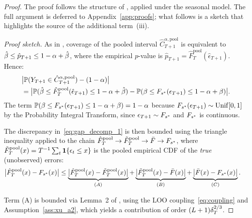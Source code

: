 \begin{proof}
The proof follows the structure of \citet[Theorem~1]{xu2023conformal},
applied under the seasonal model.  The full argument is deferred to
Appendix~\ref{app:proofs}; what follows is a sketch that highlights
the source of the additional term~(iii).

\medskip\noindent\textit{Proof sketch.}
As in \citet{xu2023conformal}, coverage of the pooled interval
$\hat{C}_{T+1}^{\alpha,\text{pool}}$ is equivalent to
$\hat{\beta} \leq \hat{p}_{T+1} \leq 1-\alpha+\hat{\beta}$,
where the empirical $p$-value is
$\hat{p}_{T+1} = \hat{F}_T^{\text{pool}}(\hat{\epsilon}_{T+1})$.
Hence:
\begin{align}
  \label{eq:gap_decomp_1}
  &\bigl|\mathbb{P}(Y_{T+1} \in \hat{C}_{T+1}^{\alpha,\text{pool}}) - (1-\alpha)\bigr|
  \notag\\
  &= \bigl|\mathbb{P}(\hat{\beta} \leq \hat{F}_T^{\text{pool}}(\hat{\epsilon}_{T+1})
     \leq 1-\alpha+\hat{\beta})
     - \mathbb{P}(\beta \leq F_{s^*}(\epsilon_{T+1}) \leq 1-\alpha+\beta)\bigr|.
\end{align}
The term $\mathbb{P}(\beta \leq F_{s^*}(\epsilon_{T+1}) \leq 1-\alpha+\beta) = 1-\alpha$
because $F_{s^*}(\epsilon_{T+1}) \sim \mathrm{Unif}[0,1]$
by the Probability Integral Transform, since $\epsilon_{T+1} \sim F_{s^*}$
and $F_{s^*}$ is continuous.

The discrepancy in~\eqref{eq:gap_decomp_1} is then bounded using
the triangle inequality applied to the chain
$\hat{F}_T^{\text{pool}} \to \tilde{F}_T^{\text{pool}} \to \bar{F} \to F_{s^*}$,
where $\tilde{F}_T^{\text{pool}}(x) = T^{-1}\sum_t \mathbf{1}\!\left\{\epsilon_t \leq x\right\}$
is the pooled empirical CDF of the \emph{true} (unobserved) errors:
\begin{align}
  \label{eq:triangle}
  \bigl|\hat{F}_T^{\text{pool}}(x) - F_{s^*}(x)\bigr|
  &\leq
  \underbrace{\bigl|\hat{F}_T^{\text{pool}}(x) -
               \tilde{F}_T^{\text{pool}}(x)\bigr|}_{(A)}
  +
  \underbrace{\bigl|\tilde{F}_T^{\text{pool}}(x) -
               \bar{F}(x)\bigr|}_{(B)}
  +
  \underbrace{\bigl|\bar{F}(x) - F_{s^*}(x)\bigr|}_{(C)}.
\end{align}

Term (A) is bounded via Lemma~2 of \citet{xu2023conformal},
using the LOO coupling~\eqref{eq:coupling} and
Assumption~\ref{ass:xu_a2}, which yields a contribution of order
$(L+1)\delta_T^{2/3}$.


\end{proof}

